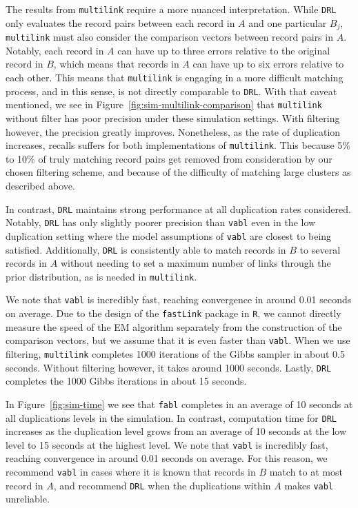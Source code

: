 \documentclass[12pt,letterpaper]{article}
\newcommand{\1}[1]{\mathbb{I}\!\left[#1\right]} %
\begin{document}
The results from \texttt{multilink} require a more nuanced interpretation. While \texttt{DRL} only evaluates the record pairs between each record in $A$ and one particular $B_j$, \texttt{multilink} must also consider the comparison vectors between record pairs in $A$. Notably, each record in $A$ can have up to three errors relative to the original record in $B$, which means that records in $A$ can have up to six errors relative to each other. This means that \texttt{multilink} is engaging in a more difficult matching process, and in this sense, is not directly comparable to \texttt{DRL}. With that caveat mentioned, we see in Figure~\ref{fig:sim-multilink-comparison} that \texttt{multilink} without filter has poor precision under these simulation settings. With filtering however, the precision greatly improves. Nonetheless, as the rate of duplication increases, recalls suffers for both implementations of \texttt{multilink}. This because 5\% to 10\% of truly matching record pairs get removed from consideration by our chosen filtering scheme, and because of the difficulty of matching large clusters as described above.

In contrast, \texttt{DRL} maintains strong performance at all duplication rates considered. Notably, \texttt{DRL} has only slightly poorer precision than \texttt{vabl} even in the low duplication setting where the model assumptions of \texttt{vabl} are closest to being satisfied. Additionally, \texttt{DRL} is consistently able to match records in $B$ to several records in $A$ without needing to set a maximum number of links through the prior distribution, as is needed in \texttt{multilink}. 

We note that \texttt{vabl} is incredibly fast, reaching convergence in around 0.01 seconds on average. Due to the design of the \texttt{fastLink} package in \texttt{R}, we cannot directly measure the speed of the EM algorithm separately from the construction of the comparison vectors, but we assume that it is even faster than \texttt{vabl}. When we use filtering, \texttt{multilink} completes 1000 iterations of the Gibbs sampler in about 0.5 seconds. Without filtering however, it takes around 1000 seconds. Lastly, \texttt{DRL} completes the 1000 Gibbs iterations in about 15 seconds. 

In Figure~\ref{fig:sim-time} we see that \texttt{fabl} completes in an average of 10 seconds at all duplications levels in the simulation. In contrast, computation time for \texttt{DRL} increases as the duplication level grows from an average of 10 seconds at the low level to 15 seconds at the highest level. We note that \texttt{vabl} is incredibly fast, reaching convergence in around 0.01 seconds on average. For this reason, we recommend \texttt{vabl} in cases where it is known that records in $B$ match to at most record in $A$, and recommend \texttt{DRL} when the duplications within $A$ makes \texttt{vabl} unreliable. 
\end{document}
